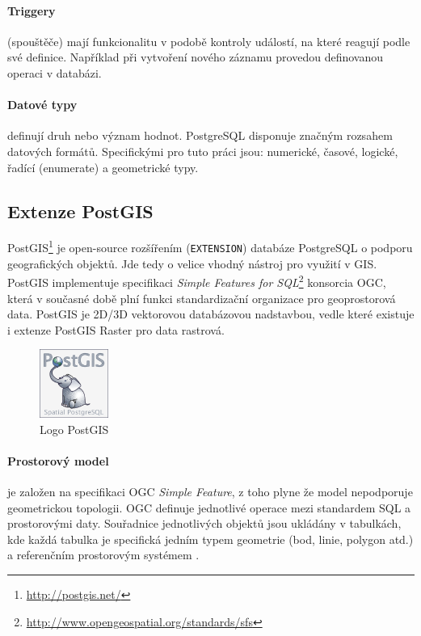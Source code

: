 \documentclass[a4paper,12pt,oneside]{report}
\begin{document}
\paragraph*{Triggery} (spouštěče) mají funkcionalitu v podobě kontroly
událostí, na které reagují podle své definice. Například při vytvoření
nového záznamu provedou definovanou operaci v databázi.

\paragraph*{Datové typy} definují druh nebo význam hodnot.
PostgreSQL disponuje značným rozsahem datových formátů. Specifickými pro tuto
práci jsou: numerické, časové, logické, řadící (enumerate) a
geometrické typy.

\subsection{Extenze PostGIS}
\label{subsec:postgis}
PostGIS\footnote{\url{http://postgis.net/}} je open-source rozšířením
(\texttt{EXTENSION}) databáze PostgreSQL o podporu geografických
objektů. Jde tedy o velice vhodný nástroj pro využití v GIS. PostGIS
implementuje specifikaci \textit{Simple Features for
  SQL}\footnote{\url{http://www.opengeospatial.org/standards/sfs} }
konsorcia \acs{OGC}, která v současné době plní funkci standardizační
organizace pro geoprostorová data. PostGIS je 2D/3D vektorovou
databázovou nadstavbou, vedle které existuje i extenze PostGIS Raster pro data rastrová.

  
\begin{figure}[h!]
    \centering
    \includegraphics[width=0.2\textwidth]{./img/implementace/postgis.png}
    \caption[Logo PostGIS]{\centering  Logo PostGIS \footnotemark}
 \end{figure}   

\paragraph*{Prostorový model} 
je založen na specifikaci    \acs{OGC} \textit{Simple Feature}, z toho
plyne že model nepodporuje geometrickou topologii. OGC definuje
jednotlivé operace mezi standardem SQL a prostorovými daty. Souřadnice
jednotlivých objektů jsou ukládány v tabulkách, kde každá tabulka je
specifická jedním typem geometrie (bod, linie, polygon atd.) a
referenčním prostorovým systémem \cite{postgis}. 
\end{document}
